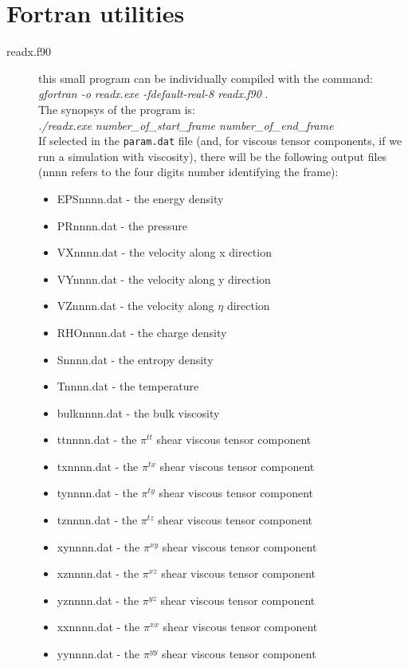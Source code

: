 \section{Fortran utilities}
\begin{description}
\item [readx.f90] this small program can be individually compiled with the command: \textit{gfortran -o readx.exe -fdefault-real-8 readx.f90} .\\
The synopsys of the program is:\\
\textit{./readx.exe number\_of\_start\_frame number\_of\_end\_frame}\\
If selected in the {\tt param.dat} file (and, for viscous tensor components, if we run a simulation with viscosity), there will be the following output files (nnnn refers to the four digits number identifying the frame):
\begin{itemize}
\item EPSnnnn.dat - the energy density
\item PRnnnn.dat - the pressure
\item VXnnnn.dat - the velocity along x direction
\item VYnnnn.dat - the velocity along y direction
\item VZnnnn.dat - the velocity along $\eta$ direction
\item RHOnnnn.dat - the charge density
\item Snnnn.dat - the entropy density
\item Tnnnn.dat - the temperature
\item bulknnnn.dat - the bulk viscosity
\item ttnnnn.dat - the $\pi^{tt}$ shear viscous tensor component
\item txnnnn.dat - the $\pi^{tx}$ shear viscous tensor component
\item tynnnn.dat - the $\pi^{ty}$ shear viscous tensor component
\item tznnnn.dat - the $\pi^{tz}$ shear viscous tensor component
\item xynnnn.dat - the $\pi^{xy}$ shear viscous tensor component
\item xznnnn.dat - the $\pi^{xz}$ shear viscous tensor component
\item yznnnn.dat - the $\pi^{yz}$ shear viscous tensor component
\item xxnnnn.dat - the $\pi^{xx}$ shear viscous tensor component
\item yynnnn.dat - the $\pi^{yy}$ shear viscous tensor component

\end{itemize}
\end{description}
